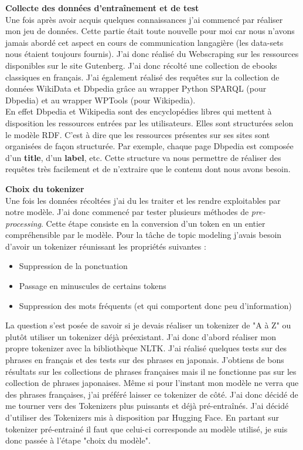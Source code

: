 \documentclass[12pt]{article}
\begin{document}
\textbf{Collecte des données d'entraînement et de test} \\
Une fois après avoir acquis quelques connaissances j'ai commencé par réaliser mon jeu de données. Cette partie était toute nouvelle pour moi car nous n'avons jamais abordé cet aspect en cours de communication langagière (les data-sets nous étaient toujours fournis). J'ai donc réalisé du Webscraping sur les ressources disponibles sur le site Gutenberg. J'ai donc récolté une collection de ebooks classiques en français.
J'ai également réalisé des requêtes sur la collection de données WikiData et Dbpedia grâce au wrapper Python SPARQL (pour Dbpedia) et au wrapper WPTools (pour Wikipedia). \\
En effet Dbpedia et Wikipedia sont des encyclopédies libres qui mettent à disposition les ressources entrées par les utilisateurs. Elles sont structurées selon le modèle RDF. C'est à dire que les ressources présentes sur ses sites sont organisées de façon structurée. Par exemple, chaque page Dbpedia est composée d'un \textbf{title}, d'un \textbf{label}, etc. Cette structure va nous permettre de réaliser des requêtes très facilement et de n'extraire que le contenu dont nous avons besoin. \\

\clearpage

\textbf{Choix du tokenizer} \\
Une fois les données récoltées j'ai du les traiter et les rendre exploitables par notre modèle. J'ai donc commencé par tester plusieurs méthodes de \textit{pre-processing}. Cette étape consiste en la conversion d'un token en un entier compréhensible par le modèle. Pour la tâche de topic modeling j'avais besoin d'avoir un  tokenizer réunissant les propriétés suivantes :

\begin{itemize}
    \item Suppression de la ponctuation 
    \item Passage en minuscules de certains tokens 
    \item Suppression des mots fréquents (et qui comportent donc peu d'information)
\end{itemize} 


La question s'est posée de savoir si je devais réaliser un tokenizer de "A à Z" ou plutôt utiliser un tokenizer déjà préexistant. J'ai donc d'abord réaliser mon propre tokenizer avec la bibliothèque NLTK. J'ai réalisé quelques tests sur des phrases en français et des tests sur des phrases en japonais. J'obtiens de bons résultats sur les collections de phrases françaises mais il ne fonctionne pas sur les collection de phrases japonaises. Même si pour l'instant mon modèle ne verra que des phrases françaises, j'ai préféré laisser ce tokenizer de côté. 
J'ai donc décidé de me tourner vers des Tokenizers plus puissants et déjà pré-entraînés. J'ai décidé d'utiliser des Tokenizers mis à disposition par Hugging Face. En partant sur tokenizer pré-entrainé il faut que celui-ci corresponde au modèle utilisé, je suis donc passée à l'étape "choix du modèle". \\
\end{document}
